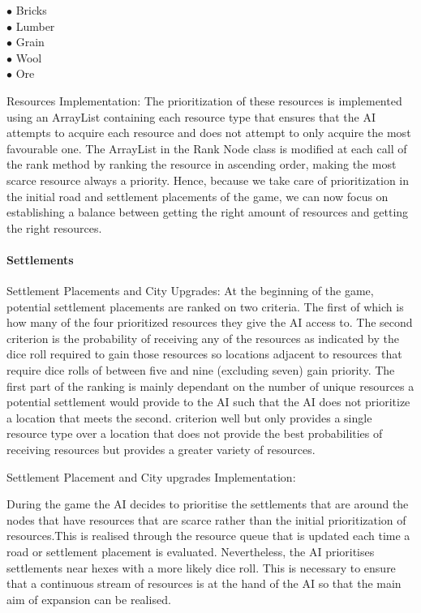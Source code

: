 \documentclass[a4paper,doc,draftfirst]{apa6}
\begin{document}
\begin{description}
\item[$\bullet$ Bricks]
\item[$\bullet$ Lumber]
\item[$\bullet$ Grain]
\item[$\bullet$ Wool]
\item[$\bullet$ Ore]
\end{description}

Resources Implementation:
The prioritization of these resources is implemented using an ArrayList containing each resource type that ensures that the AI attempts to acquire each resource and does not attempt to only acquire the most favourable one. The ArrayList in the Rank Node class is modified at each call of the rank method by ranking the resource in ascending order, making the most scarce resource always a priority. Hence, because we take care of prioritization in the initial road and settlement placements of the game, we can now focus on establishing a balance between getting the right amount of resources and getting the right resources.

\paragraph{Settlements}
Settlement Placements and City Upgrades:
	At the beginning of the game, potential settlement placements are ranked on two criteria. The first of which is how many of the four prioritized resources they give the AI access to. The second criterion is the probability of receiving any of the resources as indicated by the dice roll required to gain those resources so locations adjacent to resources that require dice rolls of  between five and nine (excluding seven) gain priority. The first part of the ranking is mainly dependant on the number of unique resources a potential settlement would provide to the AI such that the AI does not prioritize a location that meets the second. criterion well but only provides a single resource type over a location that does not provide the best probabilities of receiving resources but provides a greater variety of resources.

Settlement Placement and City upgrades Implementation:

During the game the AI decides to prioritise the settlements that are around the nodes that have resources that are scarce rather than the initial prioritization of resources.This is realised through the resource queue that is updated each time a road or settlement placement is evaluated. Nevertheless, the AI prioritises settlements near hexes with a more likely dice roll. This is necessary to ensure that a continuous stream of resources is at the hand of the AI so that the main aim of expansion can be realised. 
\end{document}
